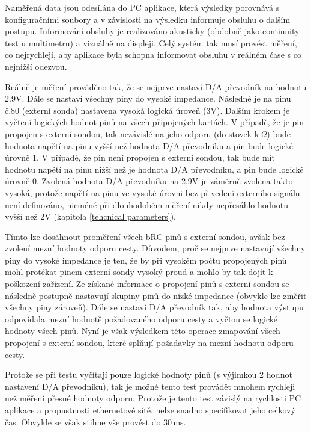 Naměřená data jsou odesílána do PC aplikace, která výsledky porovnává
s konfiguračními soubory a v závislosti na výsledku informuje obsluhu o dalším postupu.
Informování obsluhy je realizováno akusticky (obdobně jako continuity test u multimetru)
a vizuálně na displeji. Celý systém tak musí provést měření, co nejrychleji, aby aplikace byla schopna informovat
obsluhu v reálném čase s co nejnižší odezvou.\par

Reálně je měření prováděno tak, že se nejprve nastaví D/A převodník na hodnotu 2.9V.
Dále se nastaví všechny piny do vysoké impedance. Následně je na pinu č.80 (externí sonda) nastavena vysoká logická úroveň (3V).
Dalším krokem je vyčtení logických hodnot pinů na všech připojených kartách. V případě, že je pin propojen s externí sondou,
tak nezávislé na jeho odporu (do stovek k\,$\Omega$) bude hodnota napětí na pinu vyšší než hodnota D/A převodníku a pin
bude logické úrovně 1. V případě, že pin není propojen s externí sondou, tak bude mít hodnotu napětí na pinu nižší než je hodnota
D/A převodníku, a pin bude logické úrovně 0. Zvolená hodnota D/A převodníku na 2.9V je záměrně zvolena takto vysoká, protože
napětí na pinu ve vysoké úrovni bez přivedení externího signálu není definováno, nicméně při dlouhodobém měření nikdy nepřesáhlo
hodnotu vyšší než 2V (kapitola \ref{tehcnical parameters}).\par

Tímto lze dosáhnout proměření všech bRC pinů s externí sondou, avšak bez zvolení mezní hodnoty odporu cesty. Důvodem,
proč se nejprve nastavují všechny piny do vysoké impedance je ten, že by při vysokém počtu propojených pinů mohl protékat
pinem externí sondy vysoký proud a mohlo by tak dojít k poškození zařízení. Ze získané informace o propojení pinů s externí sondou
se následně postupně nastavují skupiny pinů do nízké impedance (obvykle lze změřit všechny piny zároveň). Dále se nastaví D/A převodník
tak, aby hodnota výstupu odpovídala mezní hodnotě požadovaného odporu cesty a vyčtou se logické hodnoty všech pinů.
Nyní je však výsledkem této operace zmapování všech propojení s externí sondou, které splňují požadavky na mezní hodnotu odporu cesty.\par

Protože se při testu vyčítají pouze logické hodnoty pinů (s výjimkou 2 hodnot nastavení D/A převodníku),
tak je možné tento test provádět mnohem rychleji než měření přesné hodnoty odporu.
Protože je tento test závislý na rychlosti PC aplikace a propustnosti ethernetové sítě,
nelze snadno specifikovat jeho celkový čas. Obvykle se však stihne vše provést do 30\,ms.

